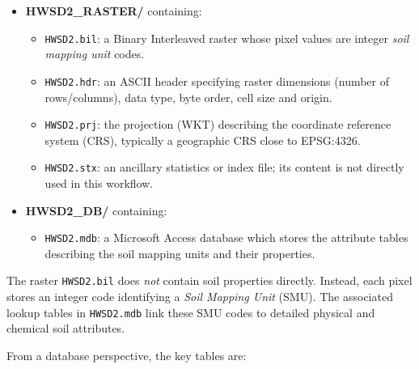\begin{itemize}
    \item \textbf{HWSD2\_RASTER/} containing:
    \begin{itemize}
        \item \texttt{HWSD2.bil}: a Binary Interleaved raster whose pixel values
        are integer \emph{soil mapping unit} codes.
        \item \texttt{HWSD2.hdr}: an ASCII header specifying raster dimensions
        (number of rows/columns), data type, byte order, cell size and origin.
        \item \texttt{HWSD2.prj}: the projection (WKT) describing the coordinate
        reference system (CRS), typically a geographic CRS close to EPSG:4326.
        \item \texttt{HWSD2.stx}: an ancillary statistics or index file; its
        content is not directly used in this workflow.
    \end{itemize}
    \item \textbf{HWSD2\_DB/} containing:
    \begin{itemize}
        \item \texttt{HWSD2.mdb}: a Microsoft Access database which stores the
        attribute tables describing the soil mapping units and their properties.
    \end{itemize}
\end{itemize}

The raster \texttt{HWSD2.bil} does \emph{not} contain soil properties directly.
Instead, each pixel stores an integer code identifying a \emph{Soil Mapping Unit}
(SMU). The associated lookup tables in \texttt{HWSD2.mdb} link these SMU codes
to detailed physical and chemical soil attributes.

From a database perspective, the key tables are:

